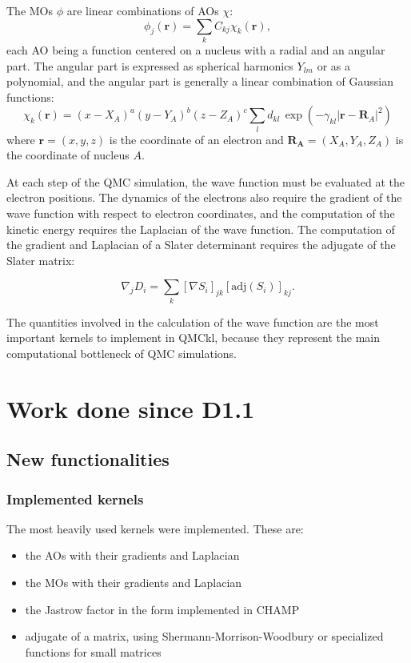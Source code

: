 The \acp{MO} $\phi$ are linear combinations of \acp{AO} $\chi$:
\begin{equation}
  \phi_j(\mathbf{r}) = \sum_k C_{kj} \chi_k(\mathbf{r}),
\end{equation}
each \ac{AO} being a function centered on a nucleus with a radial and an angular part.
The angular part is expressed as spherical harmonics $Y_{lm}$ or as a polynomial, and
the angular part is generally a linear combination of Gaussian functions:
\begin{equation}
  \chi_k(\mathbf{r}) = (x-X_A)^a (y-Y_A)^b (z-Z_A)^c \sum_l d_{kl}\, \exp \left(
  -\gamma_{kl} |\mathbf{r}-\mathbf{R}_A|^2 \right)
\end{equation}
where $\mathbf{r} = (x,y,z)$ is the coordinate of an electron and
$\mathbf{R_A} = (X_A,Y_A,Z_A)$ is the coordinate of nucleus $A$.

At each step of the \ac{QMC} simulation, the wave function must be
evaluated at the electron positions. The dynamics of the electrons
also require the gradient of the wave function with respect to electron
coordinates, and the computation of the kinetic energy requires the Laplacian
of the wave function. The computation of the gradient and Laplacian of
a Slater determinant requires the adjugate of the Slater matrix:

\begin{equation}
  \nabla_j D_i = \sum_k \left[\nabla S_i \right]_{jk} \left[\mathrm{adj}(S_i)\right]_{kj}.
\end{equation}


The quantities involved in the calculation of the wave function are the most
important kernels to implement in QMCkl, because they represent the main
computational bottleneck of \ac{QMC} simulations.


\section{Work done since D1.1}

\subsection{New functionalities}

\subsubsection{Implemented kernels}

The most heavily used kernels were implemented. These are:
\begin{itemize}
  \item the \acp{AO} with their gradients and Laplacian
  \item the \acp{MO} with their gradients and Laplacian
  \item the Jastrow factor in the form implemented in CHAMP
  \item adjugate of a matrix, using Shermann-Morrison-Woodbury or
        specialized functions for small matrices
\end{itemize}

